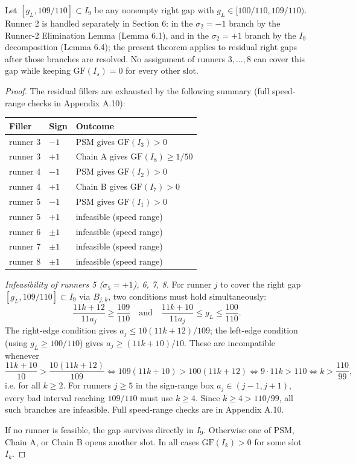 \documentclass[12pt]{article}
\begin{document}
\begin{theorem}\label{t:55}
Let $[g_L,109/110]\subset I_9$ be any nonempty
right gap with $g_L\in[100/110,109/110)$. Runner 2 is handled separately in Section 6:
in the $\sigma_2=-1$ branch by the Runner-2 Elimination Lemma (Lemma 6.1), and in the
$\sigma_2=+1$ branch by the $I_9$ decomposition (Lemma 6.4); the present theorem applies
to residual right gaps after those branches are resolved. No assignment of runners
$3,\ldots,8$ can cover this gap while keeping $\mathrm{GF}(I_s)=0$ for every other slot.

\end{theorem}
\begin{proof}
The residual fillers are exhausted by the following summary (full speed-range checks in
Appendix A.10):

\begin{center}
\begin{tabular}{@{}lll@{}}
\toprule
Filler & Sign & Outcome \\
\midrule
runner 3 & $-1$ & PSM gives $\mathrm{GF}(I_3)>0$ \\
runner 3 & $+1$ & Chain A gives $\mathrm{GF}(I_8)\ge 1/50$ \\
runner 4 & $-1$ & PSM gives $\mathrm{GF}(I_2)>0$ \\
runner 4 & $+1$ & Chain B gives $\mathrm{GF}(I_7)>0$ \\
runner 5 & $-1$ & PSM gives $\mathrm{GF}(I_1)>0$ \\
runner 5 & $+1$ & infeasible (speed range) \\
runner 6 & $\pm1$ & infeasible (speed range) \\
runner 7 & $\pm1$ & infeasible (speed range) \\
runner 8 & $\pm1$ & infeasible (speed range) \\
\bottomrule
\end{tabular}
\end{center}

\emph{Infeasibility of runners 5 ($\sigma_5=+1$), 6, 7, 8.} For runner $j$ to cover
the right gap $[g_L,109/110]\subset I_9$ via $B_{j,k}$, two conditions must hold
simultaneously:
\[
\frac{11k+12}{11a_j}\ge\frac{109}{110}\quad\text{and}\quad
  \frac{11k+10}{11a_j}\le g_L \le \frac{100}{110}.
\]
The right-edge condition gives $a_j\le 10(11k+12)/109$; the left-edge condition (using
$g_L\ge 100/110$) gives $a_j\ge(11k+10)/10$. These are incompatible whenever
\[
\frac{11k+10}{10} > \frac{10(11k+12)}{109}
  \iff 109(11k+10)>100(11k+12)
  \iff 9\cdot 11k > 110
  \iff k > \frac{110}{99},
\]
i.e. for all $k\ge 2$. For runners $j\ge 5$ in the sign-range box
$a_j\in(j-1,j+1)$, every bad interval reaching $109/110$ must use $k\ge 4$.
Since $k\ge 4>110/99$, all such branches are infeasible. Full speed-range checks are in
Appendix A.10.

If no runner is feasible, the gap survives directly in $I_9$. Otherwise one of PSM,
Chain A, or Chain B opens another slot. In all cases $\mathrm{GF}(I_k)>0$ for some
slot $I_k$.
\end{proof}
\end{document}
